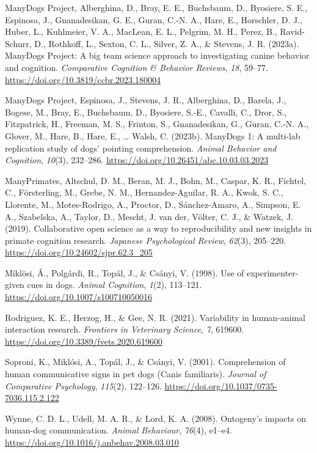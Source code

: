 \documentclass[
  pub,floatsintext]{apa6}
\newlength{\cslhangindent}
\newlength{\cslentryspacingunit} %
\newenvironment{CSLReferences}[2] %
 {%
  \setlength{\parindent}{0pt}
  \ifodd #1
  \let\oldpar\par
  \def\par{\hangindent=\cslhangindent\oldpar}
  \fi
  \setlength{\parskip}{#2\cslentryspacingunit}
 }%
 {}
\begin{document}
\begin{CSLReferences}{1}{0}
\leavevmode{}%
ManyDogs Project, Alberghina, D., Bray, E. E., Buchsbaum, D., Byosiere, S. E., Espinosa, J., Gnanadesikan, G. E., Guran, C.-N. A., Hare, E., Horschler, D. J., Huber, L., Kuhlmeier, V. A., MacLean, E. L., Pelgrim, M. H., Perez, B., Ravid-Schurr, D., Rothkoff, L., Sexton, C. L., Silver, Z. A., \& Stevens, J. R. (2023a). {ManyDogs Project}: {A} big team science approach to investigating canine behavior and cognition. \emph{Comparative Cognition \& Behavior Reviews}, \emph{18}, 59--77. \url{https://doi.org/10.3819/ccbr.2023.180004}

\leavevmode{}%
ManyDogs Project, Espinosa, J., Stevens, J. R., Alberghina, D., Barela, J., Bogese, M., Bray, E., Buchsbaum, D., Byosiere, S.-E., Cavalli, C., Dror, S., Fitzpatrick, H., Freeman, M. S., Frinton, S., Gnanadesikan, G., Guran, C.-N. A., Glover, M., Hare, B., Hare, E., \ldots{} Walsh, C. (2023b). {ManyDogs} 1: {A} multi-lab replication study of dogs' pointing comprehension. \emph{Animal Behavior and Cognition}, \emph{10}(3), 232--286. \url{https://doi.org/10.26451/abc.10.03.03.2023}

\leavevmode{}%
ManyPrimates, Altschul, D. M., Beran, M. J., Bohn, M., Caspar, K. R., Fichtel, C., Försterling, M., Grebe, N. M., Hernandez-Aguilar, R. A., Kwok, S. C., Llorente, M., Motes-Rodrigo, A., Proctor, D., Sánchez-Amaro, A., Simpson, E. A., Szabelska, A., Taylor, D., Mescht, J. van der, Völter, C. J., \& Watzek, J. (2019). Collaborative open science as a way to reproducibility and new insights in primate cognition research. \emph{Japanese Psychological Review}, \emph{62}(3), 205--220. \url{https://doi.org/10.24602/sjpr.62.3_205}

\leavevmode{}%
Miklösi, Á., Polgárdi, R., Topál, J., \& Csányi, V. (1998). Use of experimenter-given cues in dogs. \emph{Animal Cognition}, \emph{1}(2), 113--121. \url{https://doi.org/10.1007/s100710050016}

\leavevmode{}%
Rodriguez, K. E., Herzog, H., \& Gee, N. R. (2021). Variability in human-animal interaction research. \emph{Frontiers in Veterinary Science}, \emph{7}, 619600. \url{https://doi.org/10.3389/fvets.2020.619600}

\leavevmode{}%
Soproni, K., Miklósi, A., Topál, J., \& Csányi, V. (2001). Comprehension of human communicative signs in pet dogs ({Canis} familiaris). \emph{Journal of Comparative Psychology}, \emph{115}(2), 122--126. \url{https://doi.org/10.1037/0735-7036.115.2.122}

\leavevmode{}%
Wynne, C. D. L., Udell, M. A. R., \& Lord, K. A. (2008). Ontogeny's impacts on human-dog communication. \emph{Animal Behaviour}, \emph{76}(4), e1--e4. \url{https://doi.org/10.1016/j.anbehav.2008.03.010}

\end{CSLReferences}
\end{document}
